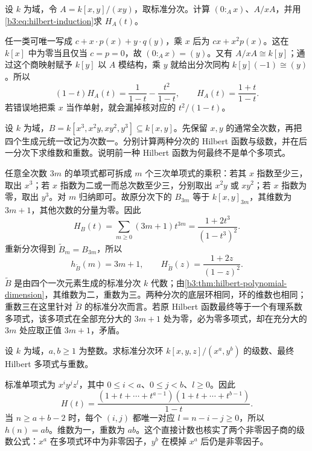 \begin{exercise}\label{b3:ex:11-zero-divisor-series}
	设 \(k\) 为域，令 \(A=k[x,y]/(xy)\)，取标准分次。计算 \((0:_A x)\)、\(A/xA\)，并用\eqref{b3:eq:hilbert-induction}求 \(H_A(t)\)。
\end{exercise}
\begin{solution}
	任一类可唯一写成 \(c+x\cdot p(x)+y\cdot q(y)\)，乘 \(x\) 后为 \(cx+x^2p(x)\)。这在 \(k[x]\) 中为零当且仅当 \(c=p=0\)，故 \((0:_A x)=(y)\)。又有 \(A/xA\cong k[y]\)；通过这个商映射赋予 \(k[y]\) 以 \(A\) 模结构，乘 \(y\) 就给出分次同构 \(k[y](-1)\cong(y)\)。所以
	\[
		(1-t)H_A(t)=\dfrac1{1-t}-\dfrac{t^2}{1-t}, \qquad H_A(t)=\dfrac{1+t}{1-t}.
	\]
	若错误地把乘 \(x\) 当作单射，就会漏掉核对应的 \(t^2/(1-t)\)。
\end{solution}

\begin{exercise}\label{b3:ex:11-veronese}
	设 \(k\) 为域，\(B=k[x^3,x^2y,xy^2,y^3]\subseteq k[x,y]\)。先保留 \(x,y\) 的通常全次数，再把四个生成元统一改记为次数一。分别计算两种分次的 Hilbert 函数与级数，并在后一分次下求维数和重数。说明前一种 Hilbert 函数为何最终不是单个多项式。
\end{exercise}
\begin{solution}
	任意全次数 \(3m\) 的单项式都可拆成 \(m\) 个三次单项式的乘积：若其 \(x\) 指数至少三，取出 \(x^3\)；若 \(x\) 指数为二或一而总次数至少三，分别取出 \(x^2y\) 或 \(xy^2\)；若 \(x\) 指数为零，取出 \(y^3\)。对 \(m\) 归纳即可。故原分次下的 \(B_{3m}\) 等于 \(k[x,y]_{3m}\)，其维数为 \(3m+1\)，其他次数的分量为零。因此
	\[
		H_B(t)=\sum_{m\ge0}(3m+1)t^{3m} =\dfrac{1+2t^3}{(1-t^3)^2}.
	\]
	重新分次得到 \(\widetilde B_m=B_{3m}\)，所以
	\[
		h_{\widetilde B}(m)=3m+1,\qquad H_{\widetilde B}(z)=\dfrac{1+2z}{(1-z)^2}.
	\]
	\(\widetilde B\) 是由四个一次元素生成的标准分次 \(k\) 代数；由\cref{b3:thm:hilbert-polynomial-dimension}，其维数为二，重数为三。两种分次的底层环相同，环的维数也相同；重数三在这里针对 \(\widetilde B\) 的标准分次而言。若原 Hilbert 函数最终等于一个有理系数多项式，该多项式在全部充分大的 \(3m+1\) 处为零，必为零多项式，却在充分大的 \(3m\) 处应取正值 \(3m+1\)，矛盾。
\end{solution}

\begin{exercise}\label{b3:ex:11-complete-intersection-count}
	设 \(k\) 为域，\(a,b\ge1\) 为整数。求标准分次环 \(k[x,y,z]/(x^a,y^b)\) 的级数、最终 Hilbert 多项式与重数。
\end{exercise}
\begin{solution}
	标准单项式为 \(x^iy^jz^l\)，其中 \(0\le i<a\)、\(0\le j<b\)、\(l\ge0\)。因此
	\[
		H(t)=\dfrac{(1+t+\cdots+t^{a-1})(1+t+\cdots+t^{b-1})}{1-t}.
	\]
	当 \(n\ge a+b-2\) 时，每个 \((i,j)\) 都唯一对应 \(l=n-i-j\ge0\)，所以 \(h(n)=ab\)。维数为一，重数为 \(ab\)。这个直接计数也核实了两个非零因子商的级数公式：\(x^a\) 在多项式环中为非零因子，\(y^b\) 在模掉 \(x^a\) 后仍是非零因子。
\end{solution}

